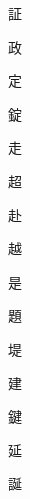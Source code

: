 \begin{spacing}{2.5}
{\Huge \begin{CJK}{UTF8}{min} 証\end{CJK}}\hspace{0.1cm}
{\Huge \begin{CJK}{UTF8}{min} 政\end{CJK}}\hspace{0.1cm}
{\Huge \begin{CJK}{UTF8}{min} 定\end{CJK}}\hspace{0.1cm}
{\Huge \begin{CJK}{UTF8}{min} 錠\end{CJK}}\hspace{0.1cm}
{\Huge \begin{CJK}{UTF8}{min} 走\end{CJK}}\hspace{0.1cm}
{\Huge \begin{CJK}{UTF8}{min} 超\end{CJK}}\hspace{0.1cm}
{\Huge \begin{CJK}{UTF8}{min} 赴\end{CJK}}\hspace{0.1cm}
{\Huge \begin{CJK}{UTF8}{min} 越\end{CJK}}\hspace{0.1cm}
{\Huge \begin{CJK}{UTF8}{min} 是\end{CJK}}\hspace{0.1cm}
{\Huge \begin{CJK}{UTF8}{min} 題\end{CJK}}\hspace{0.1cm}
{\Huge \begin{CJK}{UTF8}{min} 堤\end{CJK}}\hspace{0.1cm}
{\Huge \begin{CJK}{UTF8}{min} 建\end{CJK}}\hspace{0.1cm}
{\Huge \begin{CJK}{UTF8}{min} 鍵\end{CJK}}\hspace{0.1cm}
{\Huge \begin{CJK}{UTF8}{min} 延\end{CJK}}\hspace{0.1cm}
{\Huge \begin{CJK}{UTF8}{min} 誕\end{CJK}}\hspace{0.1cm}

\end{spacing}
